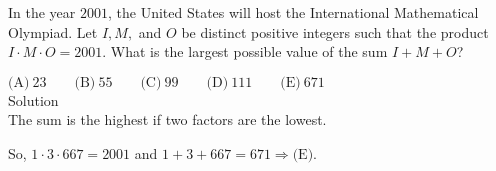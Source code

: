

In the year $2001$, the United States will host the International Mathematical Olympiad. Let $I,M,$ and $O$ be distinct positive integers such that the product $I \cdot M \cdot O = 2001$. What is the largest possible value of the sum $I + M + O$?

$\text{(A)}\ 23 \qquad \text{(B)}\ 55 \qquad \text{(C)}\ 99 \qquad \text{(D)}\ 111 \qquad \text{(E)}\ 671$
\\
Solution
\\
The sum is the highest if two factors are the lowest.

So, $1 \cdot 3 \cdot 667 = 2001$ and $1+3+667=671 \Longrightarrow \boxed{\text{(E)}}$.
